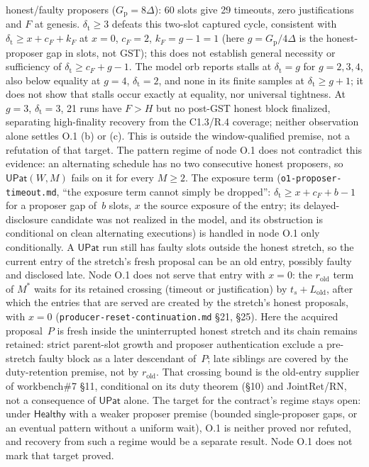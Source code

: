 \documentclass{article}
\newcommand{\cF}{c_F}
\begin{document}
honest/faulty proposers ($G_{\mathrm p}=8\Delta$): 60 slots give 29 timeouts,
zero justifications and $F$ at genesis.  $\delta_{\mathrm t}\geq3$ defeats this
two-slot captured cycle, consistent with $\delta_{\mathrm t}\geq x+\cF+k_F$ at
$x=0$, $\cF=2$, $k_F=g-1=1$ (here $g=G_{\mathrm p}/4\Delta$ is the honest-proposer
gap in slots, not GST); this does not establish general necessity or
sufficiency of $\delta_{\mathrm t}\geq\cF+g-1$.  The model orb reports stalls
at $\delta_{\mathrm t}=g$ for $g=2,3,4$, also below equality at $g=4$,
$\delta_{\mathrm t}=2$, and none in its finite samples at
$\delta_{\mathrm t}\geq g+1$; it does not show that stalls occur exactly at
equality, nor universal tightness.  At $g=3$, $\delta_{\mathrm t}=3$, 21 runs
have $F>H$ but no post-GST honest block finalized, separating
high-finality recovery from the C1.3/R.4 coverage; neither observation alone
settles O.1 (b) or (c).  This is outside the window-qualified premise, not a
refutation of that target.  The pattern regime of node O.1 does not
contradict this evidence: an alternating schedule has no two consecutive
honest proposers, so $\mathsf{UPat}(W,M)$ fails on it for every $M\geq2$.
The exposure term (\texttt{o1-proposer-timeout.md}, ``the exposure term cannot
simply be dropped'': $\delta_{\mathrm t}\geq x+\cF+b-1$ for a proposer gap of~$b$
slots, $x$ the source exposure of the entry; its delayed-disclosure candidate
was not realized in the model, and its obstruction is conditional on clean
alternating executions) is handled in node O.1 only conditionally.  A
$\mathsf{UPat}$ run still has faulty slots outside the honest stretch, so the
current entry of the stretch's fresh proposal can be an old entry, possibly
faulty and disclosed late.  Node O.1 does not serve that entry with $x=0$: the
$r_{\mathrm{old}}$ term of $M^*$ waits for its retained crossing (timeout or
justification) by $t_s+L_{\mathrm{old}}$, after which the entries that are
served are created by the stretch's honest proposals, with $x=0$
(\texttt{producer-reset-continuation.md} \S21, \S25).  Here the acquired
proposal~$P$ is fresh inside the uninterrupted honest stretch and its chain
remains retained: strict parent-slot growth and proposer authentication
exclude a pre-stretch faulty block as a later descendant of~$P$; late siblings
are covered by the duty-retention premise, not by $r_{\mathrm{old}}$.  That crossing bound is
the old-entry supplier of workbench\#7 \S11, conditional on its duty theorem
(\S10) and JointRet/RN, not a consequence of $\mathsf{UPat}$ alone.  The target for the contract's regime stays
open: under $\mathsf{Healthy}$ with a weaker proposer premise (bounded
single-proposer gaps, or an eventual pattern without a uniform wait), O.1 is
neither proved nor refuted, and recovery from such a regime would be a separate
result.  Node O.1 does not mark that target proved.
\end{document}
